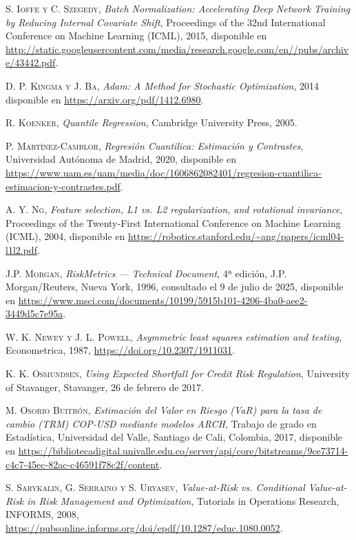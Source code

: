 \documentclass[11pt]{book}
\theoremstyle{plain} %
\theoremstyle{definition} %
\begin{document}
\begin{thebibliography}{99}
\textsc{S. Ioffe y C. Szegedy},  
\textit{Batch Normalization: Accelerating Deep Network Training by Reducing Internal Covariate Shift},  
Proceedings of the 32nd International Conference on Machine Learning (ICML), 2015, 
disponible en \url{http://static.googleusercontent.com/media/research.google.com/en//pubs/archive/43442.pdf}.

\textsc{D. P. Kingma y J. Ba},  
\textit{Adam: A Method for Stochastic Optimization}, 2014
disponible en \url{https://arxiv.org/pdf/1412.6980}.

\textsc{R. Koenker},
\textit{Quantile Regression}, 
Cambridge University Press, 2005.



\textsc{P. Martínez-Camblor},
\textit{Regresión Cuantilica: Estimación y Contrastes}, 
Universidad Autónoma de Madrid, 2020, disponible en  
\url{https://www.uam.es/uam/media/doc/1606862082401/regresion-cuantilica-estimacion-y-contrastes.pdf}.


\textsc{A. Y. Ng},  
\textit{Feature selection, L1 vs. L2 regularization, and rotational invariance},  
Proceedings of the Twenty-First International Conference on Machine Learning (ICML), 2004,  
disponible en \url{https://robotics.stanford.edu/~ang/papers/icml04-l1l2.pdf}.

\textsc{J.P. Morgan},
\textit{RiskMetrics — Technical Document},
4ª edición, J.P. Morgan/Reuters, Nueva York, 1996,  
consultado el 9 de julio de 2025, disponible en  
\url{https://www.msci.com/documents/10199/5915b101-4206-4ba0-aee2-3449d5c7e95a}.


\textsc{W. K. Newey y J. L. Powell},
\textit{Asymmetric least squares estimation and testing}, 
Econometrica, 1987,
\url{https://doi.org/10.2307/1911031}.

\textsc{K. K. Osmundsen},
\textit{Using Expected Shortfall for Credit Risk Regulation}, 
University of Stavanger, Stavanger, 26 de febrero de 2017.

\textsc{M. Osorio Buitrón},
\textit{Estimación del Valor en Riesgo (VaR) para la tasa de cambio (TRM) COP‑USD mediante modelos ARCH},  
Trabajo de grado en Estadística, Universidad del Valle, Santiago de Cali, Colombia, 2017,  
disponible en \url{https://bibliotecadigital.univalle.edu.co/server/api/core/bitstreams/9ce73714-c4c7-45ec-82ac-c46591f78c2f/content}.



\textsc{S. Sarykalin, G. Serraino y S. Uryasev},
\textit{Value-at-Risk vs. Conditional Value-at-Risk in Risk Management and Optimization}, 
Tutorials in Operations Research, INFORMS, 2008,
\url{https://pubsonline.informs.org/doi/epdf/10.1287/educ.1080.0052}.




\end{thebibliography}
\end{document}
